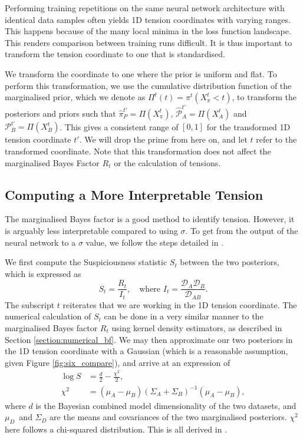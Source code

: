 \documentclass[%
 reprint,
 amsmath,amssymb,
 aps,
]{revtex4-2}
\begin{document}
Performing training repetitions on the same neural network architecture with identical data samples often yields 1D tension coordinates with varying ranges. This happens because of the many local minima in the loss function landscape. This renders comparison between training runs difficult. It is thus important to transform the tension coordinate to one that is standardised.

We transform the coordinate to one where the prior is uniform and flat. To perform this transformation, we use the cumulative distribution function of the marginalised prior, which we denote as $\Pi^t(t) = \pi^t(X_\pi^t < t)$, to transform the posteriors and priors such that $\hat{\pi}^{t'}_P = \Pi(X_\pi^t)$, $\hat{\mathcal{P}}_A^{t'} = \Pi(X_A^t)$ and $\mathcal{P}_B^{t'} = \Pi(X_B^t)$. This gives a consistent range of $[0, 1]$ for the transformed 1D tension coordinate $t'$. We will drop the prime from here on, and let $t$ refer to the transformed coordinate. Note that this transformation does not affect the marginalised Bayes Factor $R_t$ or the calculation of tensions.


\subsection{Computing a More Interpretable Tension}

The marginalised Bayes factor is a good method to identify tension. However, it is arguably less interpretable compared to using $\sigma$. To get from the output of the neural network to a $\sigma$ value, we follow the steps detailed in \cite{Handley2021}.

We first compute the Suspiciousness statistic $S_t$ between the two posteriors, which is expressed as
\begin{equation}
    S_t = \frac{R_t}{I_t}, \quad \textrm{where } I_t = \frac{\mathcal{D}_A \mathcal{D}_B}{\mathcal{D}_{AB}}.
\end{equation} 
The subscript $t$ reiterates that we are working in the 1D tension coordinate. The numerical calculation of $S_t$ can be done in a very similar manner to the marginalised Bayes factor $R_t$ using kernel density estimators, as described in Section \ref{section:numerical_bf}. We may then approximate our two posteriors in the 1D tension coordinate with a Gaussian (which is a reasonable assumption, given Figure \ref{fig:six_compare}), and arrive at an expression of 
\begin{align}
    \log S &= \frac{d}{2} - \frac{\chi^2}{2}, \\
    \chi^2 &= (\mu_A - \mu_B)(\Sigma_A + \Sigma_B)^{-1}(\mu_A - \mu_B),
\end{align}
where $d$ is the Bayesian combined model dimensionality \cite{Handley2019} of the two datasets, and  $\mu_D$\ and $\Sigma_D$ are the means and covariances of the two marginalised posteriors. $\chi^2$ here follows a chi-squared distribution. This is all derived in \cite{Handley2019}.
\end{document}
